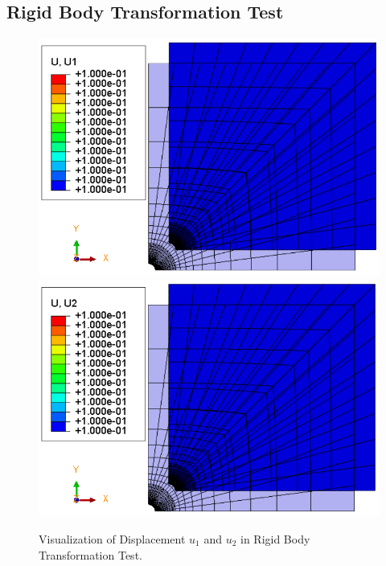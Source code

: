 \documentclass[12pt]{article}
\begin{document}
\subsection{Rigid Body Transformation Test}
\begin{figure}[H]
	\begin{center}
		\includegraphics[scale=0.49]{Rigid_body_u1_crop.png} 
	    \includegraphics[scale=0.49]{Rigid_body_u2_crop.png} 
	\end{center}
	\caption{Visualization of Displacement $u_1 $ and $u_2 $ in Rigid Body Transformation Test.} 
\end{figure}
\end{document}

